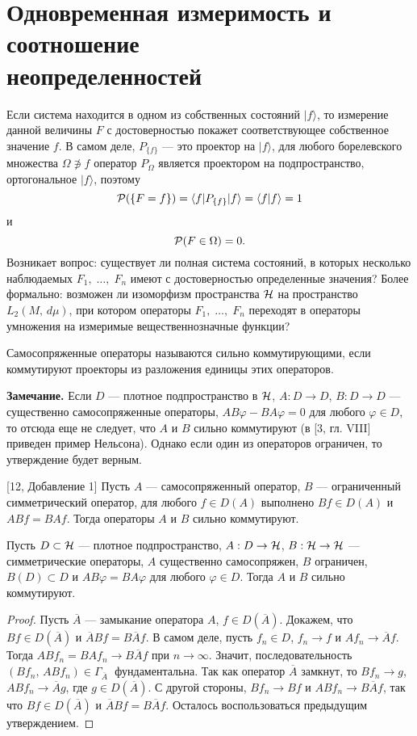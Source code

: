 \documentclass[a4paper
]{article}
\begin{document}
\section{Одновременная измеримость и соотношение \\ неопределенностей}
Если система находится в одном из собственных состояний $|f\rangle$,
то измерение данной величины $F$ с достоверностью покажет соответствующее
собственное значение $f$. В самом деле, $P_{\{f\}}$ --- это проектор на
$|f\rangle$, для любого борелевского множества $\Omega\not\ni f$
оператор $P_\Omega$ является проектором на подпространство, ортогональное
$|f\rangle$, поэтому $${\cal P}(\{F=f\})=\langle f|P_{\{f\}}|f\rangle =
\langle f|f\rangle =1$$ и $${\cal P}(F\in \Omega)=0.$$
Возникает вопрос: существует ли полная система состояний, в которых
несколько наблюдаемых $F_1, \; \dots, \; F_n$ имеют с достоверностью
определенные значения? Более формально: возможен ли изоморфизм
пространства ${\cal H}$ на пространство $L_2(M, \, d\mu)$, при котором
операторы $F_1, \; \dots, \; F_n$ переходят в операторы умножения
на измеримые вещественнозначные функции? \par
\begin{Def}
\label{str_comm}
Самосопряженные операторы называются сильно коммутирующими, если
коммутируют проекторы из разложения единицы этих операторов.
\end{Def}
{\bf Замечание.} Если $D$ --- плотное подпространство в ${\cal H}$,
$A:D\rightarrow D$, $B:D\rightarrow D$ --- существенно самосопряженные
операторы, $AB\varphi-BA\varphi=0$ для любого $\varphi\in D$, то
отсюда еще не следует, что $A$ и $B$ сильно коммутируют (в [3, гл.
VIII] приведен пример Нельсона). Однако если один из операторов
ограничен, то утверждение будет верным.
\begin{Sta} {\rm [12, Добавление 1]}
Пусть $A$ --- самосопряженный оператор, $B$ --- ограниченный симметрический оператор,
для любого $f\in D(A)$ выполнено $Bf\in D(A)$ и $ABf=BAf$. Тогда операторы
$A$ и $B$ сильно коммутируют.
\end{Sta}
\begin{Cor}
\label{cor_nelson}
Пусть $D\subset {\cal H}$ --- плотное подпространство, $A:D\rightarrow
{\cal H}$, $B:{\cal H}\rightarrow {\cal H}$ --- симметрические операторы,
$A$ существенно самосопряжен, $B$ ограничен, $B(D)\subset D$ и $AB\varphi =BA\varphi$
для любого $\varphi\in D$. Тогда
$A$ и $B$ сильно коммутируют.
\end{Cor}
\begin{proof}
Пусть $\overline A$ --- замыкание оператора $A$, $f\in D(\overline A)$.
Докажем, что $Bf\in D(\overline A)$ и $\overline ABf=B\overline Af$. В самом деле, пусть
$f_n\in D$, $f_n\rightarrow f$ и $Af_n\rightarrow \overline Af$. Тогда $ABf_n=BAf_n
\rightarrow B\overline Af$ при $n\rightarrow \infty$. Значит, последовательность
$(Bf_n, \, ABf_n)\in \Gamma _{\overline A}\;$ фундаментальна. Так как
оператор $\overline A$ замкнут, то $Bf_n\rightarrow g$, $ABf_n\rightarrow \overline Ag$,
где $g\in D(\overline A)$. С другой стороны, $Bf_n\rightarrow Bf$ и $ABf_n
\rightarrow B\overline Af$, так что $Bf\in D(\overline A)$ и $\overline ABf=B
\overline Af$. Осталось воспользоваться
предыдущим утверждением.
\end{proof}
\end{document}
